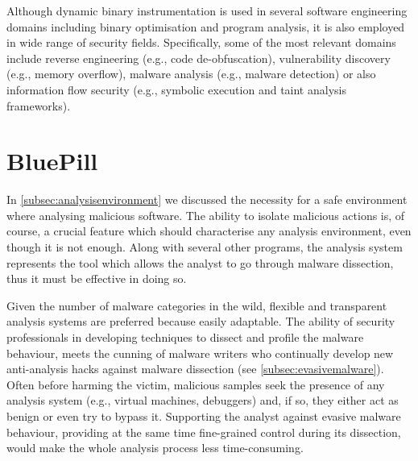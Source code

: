 \documentclass[LaM,binding=0.6cm]{sapthesis}
\begin{document}
Although dynamic binary instrumentation is used in several software engineering domains including binary optimisation and program analysis, it is also employed in wide range of security fields. Specifically, some of the most relevant domains include reverse engineering (e.g., code de-obfuscation), vulnerability discovery (e.g., memory overflow), malware analysis (e.g., malware detection) or also information flow security (e.g., symbolic execution and taint analysis frameworks).

\section{BluePill}
\label{sec:bluepill}
In \autoref{subsec:analysisenvironment} we discussed the necessity for a safe environment where analysing malicious software. The ability to isolate malicious actions is, of course, a crucial feature which should characterise any analysis environment, even though it is not enough. Along with several other programs, the analysis system represents the tool which allows the analyst to go through malware dissection, thus it must be effective in doing so.

Given the number of malware categories in the wild, flexible and transparent analysis systems are preferred because easily adaptable. The ability of security professionals in developing techniques to dissect and profile the malware behaviour, meets the cunning of malware writers who continually develop new anti-analysis hacks against malware dissection (see \autoref{subsec:evasivemalware}). Often before harming the victim, malicious samples seek the presence of any analysis system (e.g., virtual machines, debuggers) and, if so, they either act as benign or even try to bypass it. Supporting the analyst against evasive malware behaviour, providing at the same time fine-grained control during its dissection, would make the whole analysis process less time-consuming.
\end{document}
